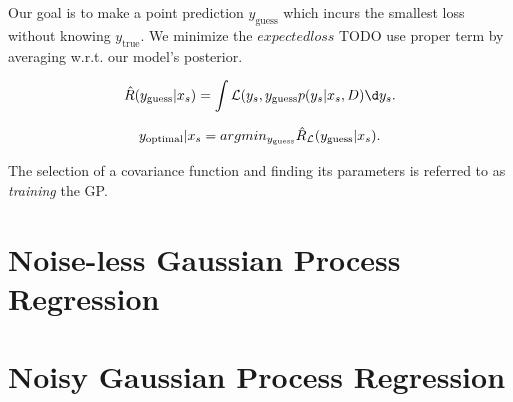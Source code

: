 Our goal is to make a point prediction $y_\text{guess}$ which incurs the smallest loss without knowing $y_\text{true}$. We minimize the $expected loss$ {TODO use proper term} by averaging w.r.t. our model's posterior.

\begin{equation}
    \hat R(y_\text{guess} | x_s ) = \int \gL (y_s, y_\text{guess} p(y_s | x_s, D) \d y_s.
\end{equation}

\begin{equation}
    y_\text{optimal} | x_s = argmin_{y_\text{guess}} \hat R_{\mathcal{L}}(y_\text{guess} | x_s).
\end{equation}

The selection of a covariance function and finding its parameters is referred to as \emph{training} the GP.



\section{Noise-less Gaussian Process Regression}

\section{Noisy Gaussian Process Regression}


